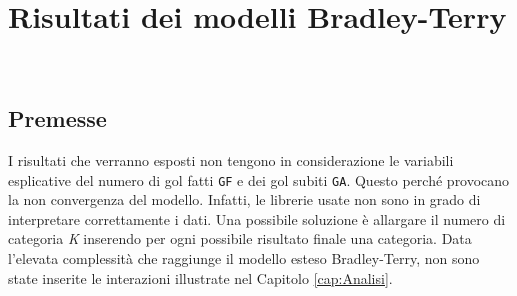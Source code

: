 
\chapter{Risultati dei modelli Bradley-Terry}
\label{cap:risultatiDM}

\\
\section {Premesse}
I risultati che verranno esposti non tengono in considerazione le variabili esplicative del numero di gol fatti \texttt {GF} e dei gol subiti \texttt{GA}. Questo perché provocano la non convergenza del modello. Infatti, le librerie usate non sono in grado di interpretare correttamente i dati. Una possibile soluzione è allargare il numero di categoria \emph{K} inserendo per ogni possibile risultato finale una categoria.  Data l'elevata complessità che raggiunge il modello esteso Bradley-Terry, non sono state inserite le interazioni illustrate nel Capitolo \ref{cap:Analisi}.


